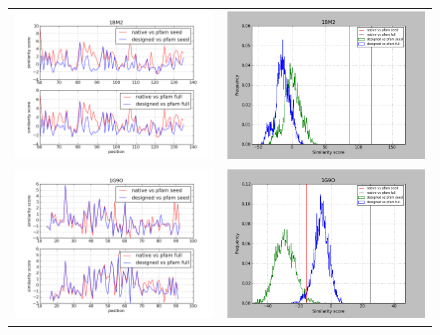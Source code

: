 \documentclass[a4paper,12pt]{article}
\begin{document}
   \begin{figure}[t]
     \centering
     \begin{tabular}{cc}
       \includegraphics[width=8.45cm]{gen_08032012/1BM2/p3/graph_simil_bypos.png} &
       \includegraphics[width=8.45cm]{gen_08032012/1BM2/p3/graph_simil_byseq.png} \\
       \includegraphics[width=8.45cm]{gen_08032012/1G9O/p3/graph_simil_bypos.png} &
       \includegraphics[width=8.45cm]{gen_08032012/1G9O/p3/graph_simil_byseq.png} \\

\end{tabular}
\end{figure}
\end{document}
